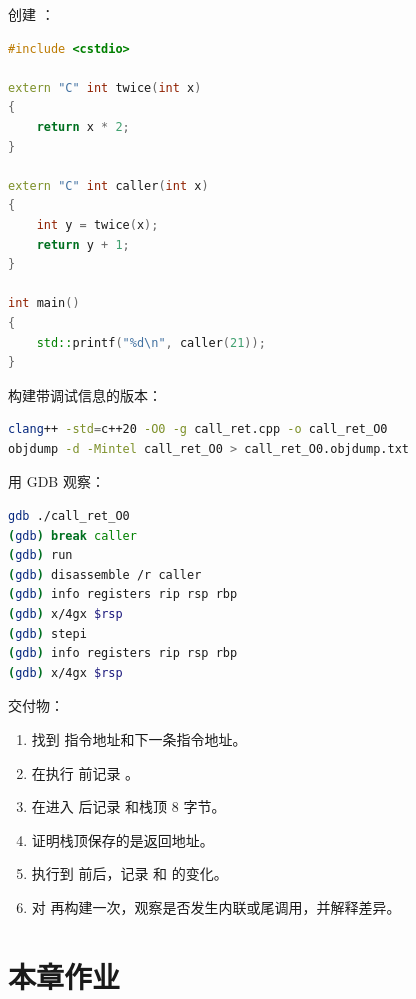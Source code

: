 \begin{labbox}
创建 ：

\begin{lstlisting}[language=C++]
#include <cstdio>

extern "C" int twice(int x)
{
    return x * 2;
}

extern "C" int caller(int x)
{
    int y = twice(x);
    return y + 1;
}

int main()
{
    std::printf("%d\n", caller(21));
}
\end{lstlisting}

构建带调试信息的版本：

\begin{lstlisting}[language=bash]
clang++ -std=c++20 -O0 -g call_ret.cpp -o call_ret_O0
objdump -d -Mintel call_ret_O0 > call_ret_O0.objdump.txt
\end{lstlisting}

用 GDB 观察：

\begin{lstlisting}[language=bash]
gdb ./call_ret_O0
(gdb) break caller
(gdb) run
(gdb) disassemble /r caller
(gdb) info registers rip rsp rbp
(gdb) x/4gx $rsp
(gdb) stepi
(gdb) info registers rip rsp rbp
(gdb) x/4gx $rsp
\end{lstlisting}

交付物：

\begin{enumerate}
  \item 找到  指令地址和下一条指令地址。
  \item 在执行  前记录 。
  \item 在进入  后记录  和栈顶 8 字节。
  \item 证明栈顶保存的是返回地址。
  \item 执行到  前后，记录  和  的变化。
  \item 对  再构建一次，观察是否发生内联或尾调用，并解释差异。
\end{enumerate}
\end{labbox}

\section{本章作业}

